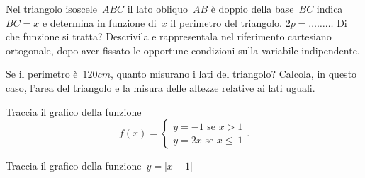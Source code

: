 % 
% 
% 

\begin{esercizio}
\label{ese:D.60}
Nel triangolo isoscele~\({ABC}\) il lato obliquo~\({AB}\) è doppio della base~\({BC}\) 
indica~\(\overline{BC}=x\) e determina in funzione
di~\(x\) il perimetro del triangolo. \(2p=\ldots \ldots \ldots\)
Di che funzione si tratta? Descrivila e rappresentala nel riferimento cartesiano 
ortogonale, dopo aver fissato le opportune condizioni
sulla variabile indipendente.

Se il perimetro è~\(120\unit{cm}\), quanto misurano i lati del triangolo?
Calcola, in questo caso, l'area del triangolo e la misura delle altezze relative 
ai lati uguali.
\end{esercizio}

\begin{esercizio}
\label{ese:D.61}
Traccia il grafico della funzione
\[f(x)=\left\{\begin{array}{l}
y=-1\text{ se } x>1\\
y=2x\text{ se } x \le~1\end{array}\right..\]
\end{esercizio}

\begin{esercizio}
\label{ese:D.62}
Traccia il grafico della funzione~\(y=|{x+1}|\)
\end{esercizio}

